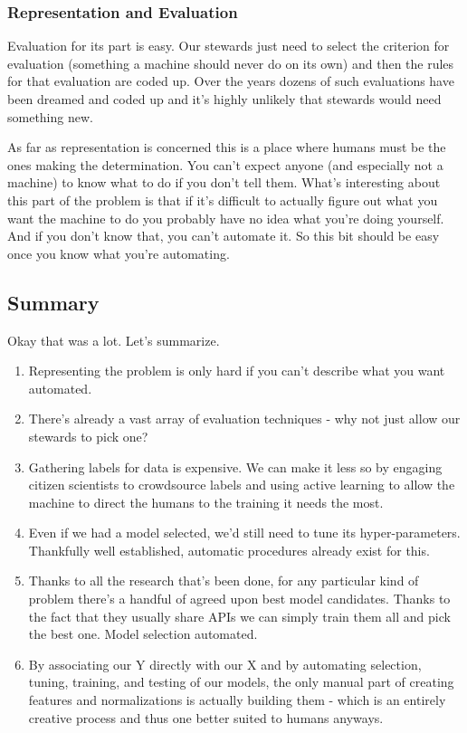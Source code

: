 \documentclass[10pt,a5paper]{book}
\begin{document}
\subsubsection{Representation and Evaluation}
Evaluation for its part is easy. Our stewards just need to select the criterion for evaluation (something a machine should never do on its own) and then the rules for that evaluation are coded up. Over the years dozens of such evaluations have been dreamed and coded up and it's highly unlikely that stewards would need something new.

As far as representation is concerned this is a place where humans must be the ones making the determination. You can't expect anyone (and especially not a machine) to know what to do if you don't tell them. What's interesting about this part of the problem is that if it's difficult to actually figure out what you want the machine to do you probably have no idea what you're doing yourself. And if you don't know that, you can't automate it. So this bit should be easy once you know what you're automating. 

\subsection{Summary}
Okay that was a lot. Let's summarize. 
\begin{enumerate}
\item Representing the problem is only hard if you can't describe what you want automated.
\item There's already a vast array of evaluation techniques - why not just allow our stewards to pick one?
\item Gathering labels for data is expensive. We can make it less so by engaging citizen scientists to crowdsource labels and using active learning to allow the machine to direct the humans to the training it needs the most. 
\item Even if we had a model selected, we'd still need to tune its hyper-parameters. Thankfully well established, automatic procedures already exist for this.
\item Thanks to all the research that's been done, for any particular kind of problem there's a handful of agreed upon best model candidates. Thanks to the fact that they usually share APIs we can simply train them all and pick the best one. Model selection automated.
\item By associating our Y directly with our X and by automating selection, tuning, training, and testing of our models, the only manual part of creating features and normalizations is actually building them - which is an entirely creative process and thus one better suited to humans anyways. 
\end{enumerate}
\end{document}
